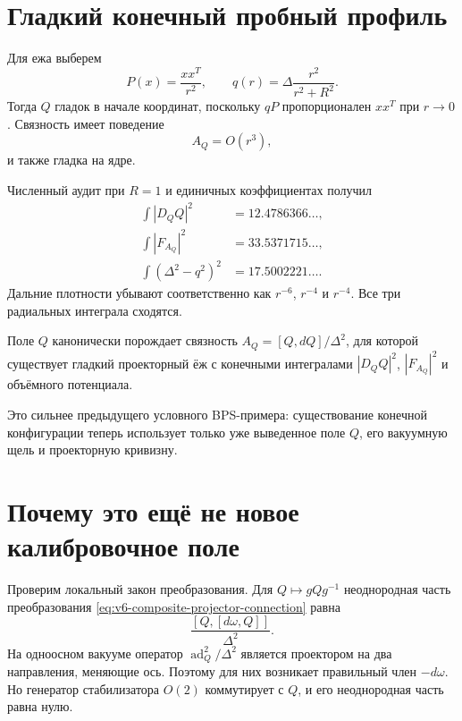 \section{Гладкий конечный пробный профиль}

Для ежа выберем
\begin{equation}
 P(x)=\frac{xx^T}{r^2},
 \qquad
 q(r)=\Delta\frac{r^2}{r^2+R^2}.
 \label{eq:v6-composite-smooth-profile}
\end{equation}
Тогда $Q$ гладок в начале координат, поскольку $qP$ пропорционален
$xx^T$ при $r\to0$. Связность имеет поведение
\begin{equation}
 A_Q=O(r^3),
\end{equation}
и также гладка на ядре.

Численный аудит при $R=1$ и единичных коэффициентах получил
\begin{align}
 \int|D_QQ|^2&=12.4786366\ldots,\\
 \int|F_{A_Q}|^2&=33.5371715\ldots,\\
 \int(\Delta^2-q^2)^2&=17.5002221\ldots.
 \label{eq:v6-composite-finite-integrals}
\end{align}
Дальние плотности убывают соответственно как
$r^{-6}$, $r^{-4}$ и $r^{-4}$. Все три радиальных интеграла сходятся.

\begin{theorem}
Поле $Q$ канонически порождает связность $A_Q=[Q,dQ]/\Delta^2$, для
которой существует гладкий проекторный ёж с конечными интегралами
$|D_QQ|^2$, $|F_{A_Q}|^2$ и объёмного потенциала.
\end{theorem}

Это сильнее предыдущего условного BPS-примера: существование конечной
конфигурации теперь использует только уже выведенное поле $Q$, его
вакуумную щель и проекторную кривизну.

\section{Почему это ещё не новое калибровочное поле}

Проверим локальный закон преобразования. Для
$Q\mapsto gQg^{-1}$ неоднородная часть преобразования
\eqref{eq:v6-composite-projector-connection} равна
\begin{equation}
 \frac{[Q,[d\omega,Q]]}{\Delta^2}.
 \label{eq:v6-composite-local-transform}
\end{equation}
На одноосном вакууме оператор $\operatorname{ad}_Q^2/\Delta^2$ является
проектором на два направления, меняющие ось. Поэтому для них возникает
правильный член $-d\omega$. Но генератор стабилизатора $O(2)$ коммутирует
с $Q$, и его неоднородная часть равна нулю.

